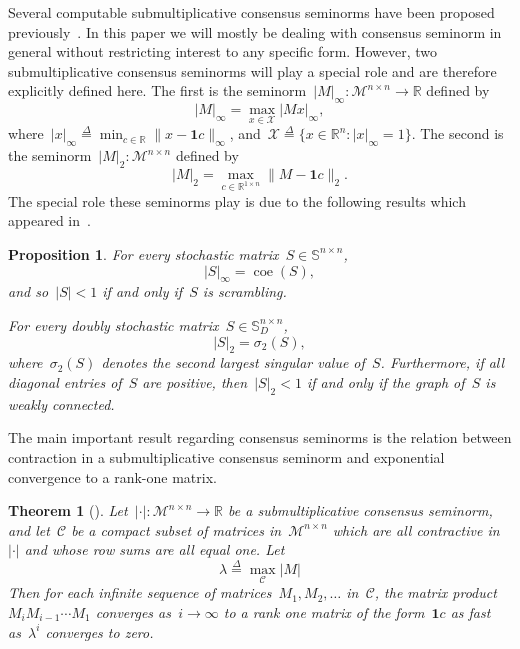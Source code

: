 \documentclass[letterpaper, 10 pt, conference]{ieeeconf}  %
\newtheorem{theorem}{Theorem}
\newtheorem{proposition}{Proposition}
\newcommand{\R}{\mathbb R}
\newcommand{\dfb}{\stackrel{\Delta}{=}}
\newcommand{\gensn}[1]{|#1|} %
\DeclareMathOperator{\coe}{coe} %
\newcommand{\eqrowsum}{\mathcal{M}} %
\newcommand{\stoc}{\mathbb{S}} %
\newcommand{\dblstoc}{\mathbb{S}_D} %
\begin{document}
Several computable submultiplicative consensus seminorms have been proposed previously~\cite{Liu2011DetGossip,DePasquale2024seminorms,Ofir2025ConsensusSeminorms}. In this paper we will mostly be dealing with consensus seminorm in general without restricting interest to any specific form. However, two submultiplicative consensus seminorms will play a special role and are therefore explicitly defined here. The first is the seminorm~$\gensn{M}_\infty : \eqrowsum^{n \times n} \to \R$ defined by
\begin{equation}
    \gensn{M}_\infty = \max_{x \in \mathcal{X}} |Mx|_\infty,
\end{equation}
where~$|x|_\infty \dfb \min_{c \in \R} \|x - \mathbf{1}c\|_\infty$, and~$\mathcal{X} \dfb \{x \in \R^n : |x|_\infty = 1\}$. The second is the seminorm~$\gensn{M}_2 : \eqrowsum^{n \times n}$ defined by
\begin{equation}
    \gensn{M}_2 = \max_{c \in \R^{1 \times n}} \|M - \mathbf{1} c\|_2.
\end{equation}
The special role these seminorms play is due to the following results which appeared in~\cite{Liu2011DetGossip,Ofir2025ConsensusSeminorms,DePasquale2024seminorms}.
\begin{proposition}
    For every stochastic matrix~$S \in \stoc^{n \times n}$,
    \begin{equation}
        \gensn{S}_\infty = \coe(S),
    \end{equation}
    and so~$\gensn{S} < 1$ if and only if~$S$ is scrambling.

    For every doubly stochastic matrix~$S \in \dblstoc^{n \times n}$,
    \begin{equation}
        \gensn{S}_2 = \sigma_2(S),
    \end{equation}
    where~$\sigma_2(S)$ denotes the second largest singular value of~$S$. Furthermore, if all diagonal entries of~$S$ are positive, then~$\gensn{S}_2 < 1$ if and only if the graph of~$S$ is weakly connected.
\end{proposition}

The main important result regarding consensus seminorms is the relation between contraction in a submultiplicative consensus seminorm and exponential convergence to a rank-one matrix.
\begin{theorem}[\cite{Ofir2025ConsensusSeminorms}]\label{thm:contract_gensn}
    Let~$\gensn{\cdot} : \eqrowsum^{n \times n} \to \R$ be a submultiplicative consensus seminorm, and let~$\mathcal{C}$ be a compact subset of matrices in~$\eqrowsum^{n \times n}$ which are all contractive in~$\gensn{\cdot}$ and whose row sums are all equal one. Let
    \begin{equation}\label{eq:gensn_lambda}
        \lambda \dfb \max_{\mathcal{C}} \gensn{M}
    \end{equation}
    Then for each infinite sequence of matrices~$M_1,M_2,\dots$ in~$\mathcal{C}$, the matrix product~$M_i M_{i-1} \cdots M_1$ converges as~$i \to \infty$ to a rank one matrix of the form~$\mathbf{1}c$ as fast as~$\lambda^i$ converges to zero.
\end{theorem}
\end{document}
